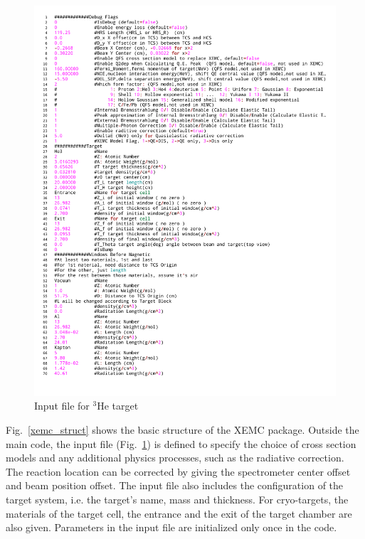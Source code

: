 \begin{figure}[!ht]
 \begin{center}
  \includegraphics[angle=0,width=1.01\textwidth]{./figures/xemc/He3_Input}
 \caption[Input file for $\mathrm{^{3}He}$ target]{Input file for $\mathrm{^{3}He}$ target}
 \label{xemc_tgt_he3}
 \end{center}
\end{figure} 
Fig.~\ref{xemc_struct} shows the basic structure of the XEMC package. Outside the main code, the input file (Fig.~\ref{xemc_tgt_he3}) is defined to specify the choice of cross section models and any additional physics processes, such as the radiative correction. The reaction location can be corrected by giving the spectrometer center offset and beam position offset. The input file also includes the configuration of the target system, i.e. the target's name, mass and thickness. For cryo-targets, the materials of the target cell, the entrance and the exit of the target chamber are also given. Parameters in the input file are initialized only once in the code.

